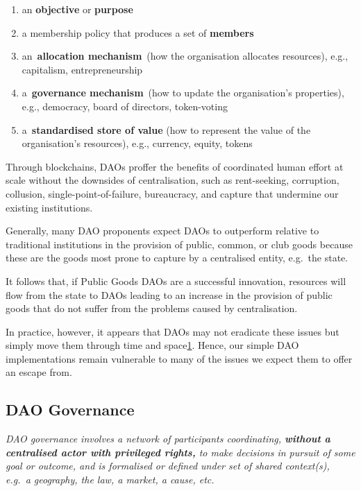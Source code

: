 \documentclass[
]{article}
\providecommand{\tightlist}{%
  \setlength{\itemsep}{0pt}\setlength{\parskip}{0pt}}
\begin{document}
\begin{enumerate}
\def\labelenumi{\arabic{enumi}.}
\tightlist
\item
  an \textbf{objective} or \textbf{purpose}
\item
  a membership policy that produces a set of \textbf{members}
\item
  an~\textbf{allocation mechanism}~(how the organisation allocates
  resources), e.g., capitalism, entrepreneurship
\item
  a~\textbf{governance mechanism}~(how to update the organisation's
  properties), e.g., democracy, board of directors, token-voting
\item
  a~\textbf{standardised store of value} (how to represent the value of
  the organisation's resources), e.g., currency, equity, tokens
\end{enumerate}

Through blockchains, DAOs proffer the benefits of coordinated human
effort at scale without the downsides of centralisation, such as
rent-seeking, corruption, collusion, single-point-of-failure,
bureaucracy, and capture that undermine our existing institutions.

Generally, many DAO proponents expect DAOs to outperform relative to
traditional institutions in the provision of public, common, or club
goods because these are the goods most prone to capture by a centralised
entity, e.g.~the state.

It follows that, if Public Goods DAOs are a successful innovation,
resources will flow from the state to DAOs leading to an increase in the
provision of public goods that do not suffer from the problems caused by
centralisation.

In practice, however, it appears that DAOs may not eradicate these
issues but simply move them through time and
space\href{https://kelsienabben.substack.com/p/towards-a-model-of-resilience-in}{1}.
Hence, our simple DAO implementations remain vulnerable to many of the
issues we expect them to offer an escape from.

\hypertarget{dao-governance}{%
\subsection{DAO Governance}\label{dao-governance}}

\emph{DAO governance involves a network of participants coordinating,
\textbf{without a centralised actor with privileged rights,} to make
decisions in pursuit of some goal or outcome, and is formalised or
defined under set of shared context(s), e.g.~a geography, the law, a
market, a cause, etc.}
\end{document}
